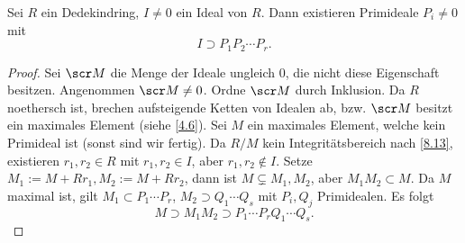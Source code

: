 \begin{lem} \label{8.18}
	Sei $R$ ein Dedekindring, $I \neq 0$ ein Ideal von $R$.
	Dann existieren Primideale $P_i \neq 0$ mit
	\[
		I \supset P_1 P_2 \dotsb P_r.
	\]
	\begin{proof}
		Sei $\scr M$ die Menge der Ideale ungleich 0, die nicht diese Eigenschaft besitzen.
		Angenommen $\scr M \neq 0$.
		Ordne $\scr M$ durch Inklusion.
		Da $R$ noethersch ist, brechen aufsteigende Ketten von Idealen ab, bzw. $\scr M$ besitzt ein maximales Element (siehe \ref{4.6}).
		Sei $M$ ein maximales Element, welche kein Primideal ist (sonst sind wir fertig).
		Da $R/M$ kein Integritätsbereich nach \ref{8.13}, existieren $r_1, r_2 \in R$ mit $r_1, r_2 \in I$, aber $r_1, r_2 \not\in I$.
		Setze $M_1 := M + Rr_1, M_2 := M + Rr_2$, dann ist $M \subsetneq M_1, M_2$, aber $M_1 M_2 \subset M$.
		Da $M$ maximal ist, gilt $M_1 \subset P_1 \dotsb P_r$, $M_2 \supset Q_1 \dotsb Q_s$ mit $P_i, Q_j$ Primidealen.
		Es folgt
		\[
			M \supset M_1 M_2 \supset P_1 \dotsb P_r Q_1 \dotsb Q_s.
		\]
	\end{proof}
\end{lem}

